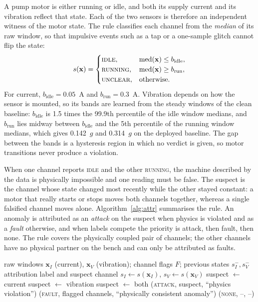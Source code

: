 \documentclass[11pt,a4paper]{article}
\begin{document}
A pump motor is either running or idle, and both its supply current and its vibration reflect that state. Each of the two sensors is therefore an independent witness of the motor state. The rule classifies each channel from the \emph{median} of its raw window, so that impulsive events such as a tap or a one-sample glitch cannot flip the state:
\begin{equation}
s(\mathbf{x}) =
\begin{cases}
\textsc{idle}, & \operatorname{med}(\mathbf{x}) \leq b_{\mathrm{idle}}, \\
\textsc{running}, & \operatorname{med}(\mathbf{x}) \geq b_{\mathrm{run}}, \\
\textsc{unclear}, & \text{otherwise.}
\end{cases}
\end{equation}
For current, $b_{\mathrm{idle}} = 0.05$~A and $b_{\mathrm{run}} = 0.3$~A. Vibration depends on how the sensor is mounted, so its bands are learned from the steady windows of the clean baseline: $b_{\mathrm{idle}}$ is 1.5 times the 99.9th percentile of the idle window medians, and $b_{\mathrm{run}}$ lies midway between $b_{\mathrm{idle}}$ and the 5th percentile of the running window medians, which gives 0.142~$g$ and 0.314~$g$ on the deployed baseline. The gap between the bands is a hysteresis region in which no verdict is given, so motor transitions never produce a violation.

When one channel reports \textsc{idle} and the other \textsc{running}, the machine described by the data is physically impossible and one reading must be false. The suspect is the channel whose state changed most recently while the other stayed constant: a motor that really starts or stops moves both channels together, whereas a single falsified channel moves alone. Algorithm~\ref{alg:attr} summarises the rule. An anomaly is attributed as an \emph{attack} on the suspect when physics is violated and as a \emph{fault} otherwise, and when labels compete the priority is attack, then fault, then none. The rule covers the physically coupled pair of channels; the other channels have no physical partner on the bench and can only be attributed as faults.

\begin{algorithm}[H]
\caption{Operating-state attribution for one window}
\label{alg:attr}
\begin{algorithmic}[1]
\Require raw windows $\mathbf{x}_I$ (current), $\mathbf{x}_V$ (vibration); channel flags $F$; previous states $s_I^{-}, s_V^{-}$
\Ensure attribution label and suspect channel
\State $s_I \gets s(\mathbf{x}_I)$, \; $s_V \gets s(\mathbf{x}_V)$
   \State suspect $\gets$ current
   \State suspect $\gets$ vibration
  \Else \State suspect $\gets$ both
  \EndIf
  \State \Return (\textsc{attack}, suspect, ``physics violation'')
  \State \Return (\textsc{fault}, flagged channels, ``physically consistent anomaly'')
\Else
  \State \Return (\textsc{none}, --, --)
\EndIf
\end{algorithmic}
\end{algorithm}
\end{document}

